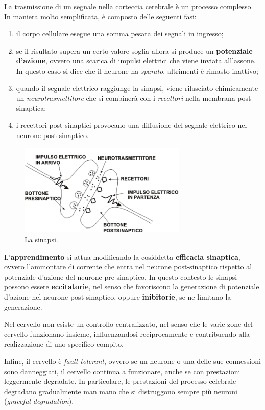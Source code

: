 La trasmissione di un segnale nella corteccia cerebrale è un processo complesso.
In maniera molto semplificata, è composto delle seguenti fasi:
\begin{enumerate}
	\item il corpo cellulare esegue una somma pesata dei segnali in ingresso;
	\item se il risultato supera un certo valore soglia allora si produce un \textbf{potenziale d'azione}, ovvero una scarica di impulsi elettrici che viene inviata all'assone. In questo caso si dice che il neurone ha \emph{sparato}, altrimenti è rimasto inattivo;
	\item quando il segnale elettrico raggiunge la sinapsi, viene rilasciato chimicamente un \emph{neurotrasmettitore} che si combinerà con i \emph{recettori} nella membrana post-sinaptica;
	\item i recettori post-sinaptici provocano una diffusione del segnale elettrico nel neurone post-sinaptico.
\end{enumerate}
\begin{figure}[h!]
	\centering
	\includegraphics[width=8cm]{images/synapse.png}
	\caption{La sinapsi.}\label{fig:synapse}
\end{figure}
L'\textbf{apprendimento} si attua modificando la cosiddetta \textbf{efficacia sinaptica}, ovvero l'ammontare di corrente che entra nel neurone post-sinaptico rispetto al potenziale d'azione del neurone pre-sinaptico. In questo contesto le sinapsi possono essere \textbf{eccitatorie}, nel senso che favoriscono la generazione di potenziale d'azione nel neurone post-sinaptico, oppure \textbf{inibitorie}, se ne limitano la generazione.

Nel cervello non esiste un controllo centralizzato, nel senso che le varie zone del cervello funzionano insieme, influenzandosi reciprocamente e contribuendo alla realizzazione di uno specifico compito.

Infine, il cervello è \emph{fault tolerant}, ovvero se un neurone o una delle sue connessioni sono danneggiati, il cervello continua a funzionare, anche se con prestazioni leggermente degradate. In particolare, le prestazioni del processo celebrale degradano gradualmente man mano che si distruggono sempre più neuroni (\emph{graceful degradation}).

